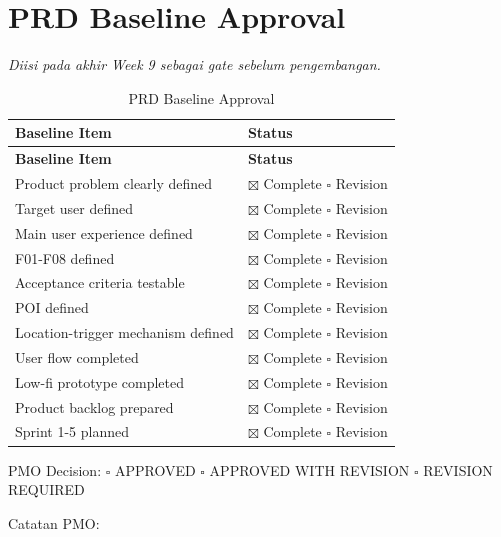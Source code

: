 \chapter{PRD Baseline Approval}
\label{bab:prd-baseline-approval}
\textit{Diisi pada akhir Week 9 sebagai gate sebelum pengembangan.}

\begin{longtable}{|L{0.500}|L{0.500}|}
\caption{PRD Baseline Approval}\\
\hline
{}\textbf{Baseline Item} & \textbf{Status} \\ \hline
\endfirsthead
\hline
{}\textbf{Baseline Item} & \textbf{Status} \\ \hline
\endhead
Product problem clearly defined & \(\boxtimes\) Complete   \(\square\) Revision \\ \hline
Target user defined & \(\boxtimes\) Complete   \(\square\) Revision \\ \hline
Main user experience defined & \(\boxtimes\) Complete   \(\square\) Revision \\ \hline
F01-F08 defined & \(\boxtimes\) Complete   \(\square\) Revision \\ \hline
Acceptance criteria testable & \(\boxtimes\) Complete   \(\square\) Revision \\ \hline
POI defined & \(\boxtimes\) Complete   \(\square\) Revision \\ \hline
Location-trigger mechanism defined & \(\boxtimes\) Complete   \(\square\) Revision \\ \hline
User flow completed & \(\boxtimes\) Complete   \(\square\) Revision \\ \hline
Low-fi prototype completed & \(\boxtimes\) Complete   \(\square\) Revision \\ \hline
Product backlog prepared & \(\boxtimes\) Complete   \(\square\) Revision \\ \hline
Sprint 1-5 planned & \(\boxtimes\) Complete   \(\square\) Revision \\ \hline
\end{longtable}

PMO Decision: \(\square\) APPROVED     \(\square\) APPROVED WITH REVISION     \(\square\) REVISION REQUIRED

Catatan PMO:
